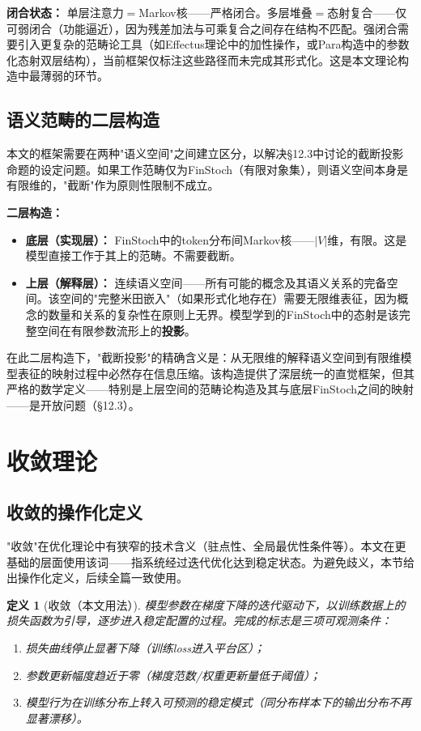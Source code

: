 \documentclass[11pt,a4paper]{ctexart}
\newtheorem{definition}[theorem]{定义}
\begin{document}
\textbf{闭合状态：} 单层注意力$=$Markov核——严格闭合。多层堆叠$=$态射复合——仅可弱闭合（功能逼近），因为残差加法与可乘复合之间存在结构不匹配。强闭合需要引入更复杂的范畴论工具（如Effectus理论\cite{Cho2015Effectus}中的加性操作，或Para构造\cite{Fong2019Para}中的参数化态射双层结构），当前框架仅标注这些路径而未完成其形式化。这是本文理论构造中最薄弱的环节。

\subsection{语义范畴的二层构造}

本文的框架需要在两种"语义空间"之间建立区分，以解决§12.3中讨论的截断投影命题的设定问题。如果工作范畴仅为FinStoch（有限对象集），则语义空间本身是有限维的，"截断"作为原则性限制不成立。

\textbf{二层构造：}
\begin{itemize}[leftmargin=*]
    \item \textbf{底层（实现层）：} FinStoch中的token分布间Markov核——$|V|$维，有限。这是模型直接工作于其上的范畴。不需要截断。
    \item \textbf{上层（解释层）：} 连续语义空间——所有可能的概念及其语义关系的完备空间。该空间的"完整米田嵌入"（如果形式化地存在）需要无限维表征，因为概念的数量和关系的复杂性在原则上无界。模型学到的FinStoch中的态射是该完整空间在有限参数流形上的\textbf{投影}。
\end{itemize}

在此二层构造下，"截断投影"的精确含义是：从无限维的解释语义空间到有限维模型表征的映射过程中必然存在信息压缩。该构造提供了深层统一的直觉框架，但其严格的数学定义——特别是上层空间的范畴论构造及其与底层FinStoch之间的映射——是开放问题（§12.3）。


\section{收敛理论}

\subsection{收敛的操作化定义}

"收敛"在优化理论中有狭窄的技术含义（驻点性、全局最优性条件等）。本文在更基础的层面使用该词——指系统经过迭代优化达到稳定状态。为避免歧义，本节给出操作化定义，后续全篇一致使用。

\begin{definition}[收敛（本文用法）]
    模型参数在梯度下降的迭代驱动下，以训练数据上的损失函数为引导，逐步进入稳定配置的过程。完成的标志是三项可观测条件：
    \begin{enumerate}[leftmargin=*]
        \item 损失曲线停止显著下降（训练loss进入平台区）；
        \item 参数更新幅度趋近于零（梯度范数/权重更新量低于阈值）；
        \item 模型行为在训练分布上转入可预测的稳定模式（同分布样本下的输出分布不再显著漂移）。
    \end{enumerate}
\end{definition}
\end{document}
